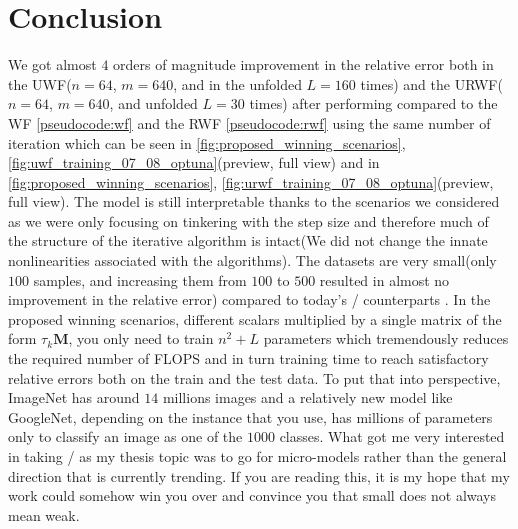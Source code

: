 \chapter{Conclusion}

We got almost $4$ orders of magnitude improvement in the relative error both in the \ac{UWF}($n=64$, $m=640$, 
and in the unfolded $L=160$ times) and the \ac{URWF}($n=64$, $m=640$, and unfolded $L=30$ times) after performing 
\ho \cite{Hutter2019}\cite{Akiba2019}\index{\hp} compared to the \ac{WF}\cite{Candes2014} 
\cref{pseudocode:wf} and the \ac{RWF}\cite{Zhang2016} 
\cref{pseudocode:rwf} using the same number of iteration which can be seen in 
\cref{fig:proposed_winning_scenarios}, \ref{fig:uwf_training_07_08_optuna}(preview, full view) and 
in \cref{fig:proposed_winning_scenarios}, \ref{fig:urwf_training_07_08_optuna}(preview, full view). The model is still 
interpretable thanks to the scenarios we considered as we were only focusing on tinkering with the step size and therefore 
much of the structure of the iterative algorithm is intact(We did not change the innate nonlinearities associated with the algorithms). The datasets are very small(only $100$ samples, and increasing 
them from $100$ to $500$ resulted in almost no improvement in the relative error) compared to today's 
\ml/\dl \cite{Goodfellow2016}\cite{LeCun2015} counterparts \cite{Krizhevsky2017}\cite{Szegedy2014}. In the proposed winning 
scenarios, different scalars multiplied by a single matrix of the form $\tau_k\boldsymbol{M}$, you only need to train 
$n^2+L$ parameters which tremendously reduces the required number of 
\ac{FLOPS}\cite{Hager2010}\cite{Hennessy2019} and in turn training time to reach satisfactory 
relative errors both on the train and the test data. To put that into perspective, ImageNet\cite{SVLL2021} 
has around $14$ millions images and a relatively new model like GoogleNet\cite{Szegedy2014}, 
depending on the instance that you use, has millions of parameters only to classify an image as one of the $1000$ 
classes. What got me very interested in taking \du/\au\cite{Monga2019} as my thesis topic was to go for micro-models 
rather than the general direction that is currently trending. If you are reading this, it is my hope that my work could 
somehow win you over and convince you that small does not always mean weak.



